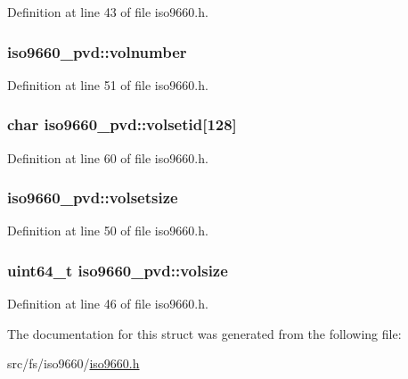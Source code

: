 Definition at line 43 of file iso9660.\+h.

\hypertarget{structiso9660__pvd_a2f1450b3f7f1256e57962d92c495a0bd}{
\subsubsection[{volnumber}]{ iso9660\+\_\+pvd\+::volnumber}}\label{structiso9660__pvd_a2f1450b3f7f1256e57962d92c495a0bd}


Definition at line 51 of file iso9660.\+h.

\hypertarget{structiso9660__pvd_a9d462ff056bae911d25439cda11ad24e}{
\subsubsection[{volsetid}]{\setlength{\rightskip}{0pt plus 5cm}char iso9660\+\_\+pvd\+::volsetid\mbox{[}128\mbox{]}}}\label{structiso9660__pvd_a9d462ff056bae911d25439cda11ad24e}


Definition at line 60 of file iso9660.\+h.

\hypertarget{structiso9660__pvd_a16db75aa8abe67319ec68ef69b8a54a3}{
\subsubsection[{volsetsize}]{ iso9660\+\_\+pvd\+::volsetsize}}\label{structiso9660__pvd_a16db75aa8abe67319ec68ef69b8a54a3}


Definition at line 50 of file iso9660.\+h.

\hypertarget{structiso9660__pvd_a3fe7f0b32c84d626dfe47f2795e43b28}{
\subsubsection[{volsize}]{\setlength{\rightskip}{0pt plus 5cm}uint64\+\_\+t iso9660\+\_\+pvd\+::volsize}}\label{structiso9660__pvd_a3fe7f0b32c84d626dfe47f2795e43b28}


Definition at line 46 of file iso9660.\+h.



The documentation for this struct was generated from the following file\+:\begin{DoxyCompactItemize}
\item 
src/fs/iso9660/\hyperlink{iso9660_8h}{iso9660.\+h}\end{DoxyCompactItemize}
